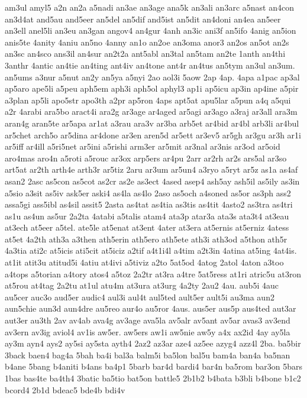 {am3ul
amyl5
a2n
an2a
a5nadi
an3ae
an3age
ana5k
an3ali
an3arc
a5nast
an4con
an3d4at
and5au
and5eer
an5del
an5dif
and5ist
an5dit
an4doni
an4ea
an5eer
an3ell
anel5li
an3eu
an3gan
angov4
an4gur
4anh
an3ic
ani3f
an5ifo
4anig
an5ion
anis5te
4anity
4aniu
an5no
4anny
an1o
an2oe
an3oma
anor3
an2os
an5ot
an2s
an3sc
an4sco
ans3il
an4sur
an2t2a
ant5abl
an3tal
an5tam
an2te
1anth
an4thi
3anthr
4antic
an4tie
an4ting
ant4iv
an4tone
ant4r
an4tus
an5tym
an3ul
an3um.
an5ums
a3nur
a5nut
an2y
an5ya
a5nyi
2ao
aol3i
5aow
2ap
4ap.
4apa
a1pac
ap3al
ap5aro
ape5li
a5peu
aph5em
aph3i
aph5ol
aphyl3
ap1i
ap5icu
ap3in
ap4ine
a5pir
a3plan
ap5li
apo5str
apo3th
a2pr
ap5ron
4aps
apt5at
apu5lar
a5pun
a4q
a5qui
a2r
4arabi
ara5bo
aract4i
ara2g
ar3age
ar4aged
ar5agi
ar3ago
a3raj
ar3all
ara3m
aran4g
aran5te
ar5apa
ar1at
a3rau
ara3v
ar3ba
arb5et
ar4bid
ar4bl
arb3li
ar4bul
ar5chet
arch5o
ar5dina
ar4done
ar3en
aren5d
ar5ett
ar3ev5
ar5gh
ar3gu
ar3h
ar1i
ar5iff
ar4ill
a5ri5net
ar5ini
a5rishi
arm3er
ar5mit
ar3nal
ar3nis
ar3od
ar5oid
aro4mas
aro4n
a5roti
a5rouc
ar3ox
arp5ers
ar4pu
2arr
ar2rh
ar2s
ars5al
ar3so
art5at
ar2th
arth4e
arth3r
ar5tiz
2aru
ar3um
ar5un4
a3ryo
a5ryt
ar5z
as1a
as4af
asan2
2asc
as5con
as5cot
as2cr
as2e
as3ect
4ased
asep4
ash5ay
ash5il
as5ily
as3in
a5sio
a3sit
as5iv
ask5er
aski4
as4la
as4lo
2aso
as5och
a4soned
as5or
as3ph
ass2
assa5gi
ass5ibl
as4sil
assit5
2asta
as4tat
as4tia
as3tis
as4tit
4asto2
as3tra
as4tri
as1u
as4un
as5ur
2a2ta
4atabi
a5talis
atam4
ata3p
atar3a
ata3s
ata3t4
at3eau
at3ech
at5eer
a5tel.
ate5le
at5enat
at3ent
4ater
at3era
at5ernis
at5erniz
4atess
at5et
4a2th
ath3a
a3then
ath5erin
ath5ero
ath5ete
ath3i
ath3od
a5thon
ath5r
4a3tia
ati2c
at5icis
ati5cit
at5iciz
a2tif
a4t1i4l
a4tim
a2t3in
4atina
at5ing
4at4is.
at1it
atit3u
atitud5i
4atiu
at4ivi
a5tiviz
a2to
5at5od
4atog
2atol
4aton
a3too
a4tops
a5torian
a4tory
atos4
a5toz
2a2tr
at3ra
a4tre
5at5ress
at1ri
atric5u
at3ron
at5rou
at4tag
2a2tu
at1ul
atu4m
at3ura
at3urg
4a2ty
2au2
4au.
aub5i
4auc
au5cer
auc3o
aud5er
audic4
aul3i
aul4t
aul5ted
ault5er
ault5i
au3ma
aun2
aun5chie
aun3d
aun4dre
au5reo
aur4o
au5ror
4aus.
aus5er
aus5p
aus4ted
aut3ar
aut3er
au3th
2av
av4ab
ava4g
av3age
ava5la
av5alr
av5ant
av5ar
avas3
av3end
av3ern
av3ig
aviol4
av1is
aw5er.
aw5ers
aw1i
aw5nie
aw5y
a4x
ax2id
4ay
ay5la
ay3m
ayn4
ays2
ay5si
ay5sta
ayth4
2az2
az3ar
aze4
az5ee
azyg4
azz4l
2ba.
ba5bir
3back
baen4
bag4a
5bah
ba4i
bal3a
balm5i
ba5lon
bal5u
bam4a
ban4a
ba5nan
b4ane
5bang
b4aniti
b4ans
ba4p1
5barb
bar4d
bardi4
bar4n
ba5rom
bar3on
5bars
1bas
bas4te
ba4th4
3batic
ba5tio
bat5on
battle5
2b1b2
b4bata
b3bli
b4bone
b1c2
bcord4
2b1d
bdeac5
bde4b
bdi4v
}
